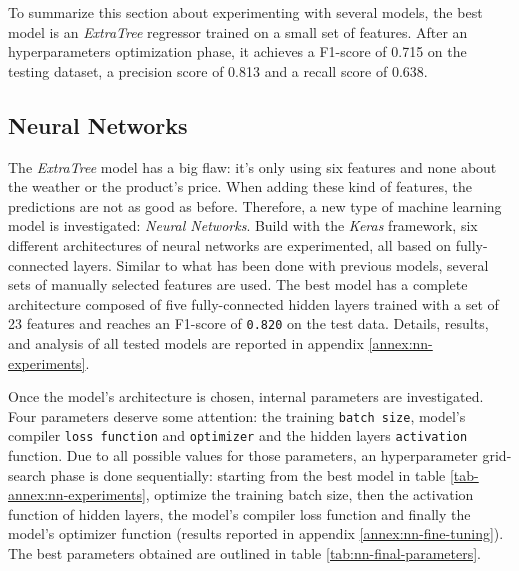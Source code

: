 To summarize this section about experimenting with several models, the best model is an \textit{ExtraTree} regressor trained on a small set of features. After an hyperparameters optimization phase, it achieves a F1-score of 0.715 on the testing dataset, a precision score of 0.813 and a recall score of 0.638.


\subsection{Neural Networks}
The \textit{ExtraTree} model has a big flaw: it's only using six features and none about the weather or the product's price. When adding these kind of features, the predictions are not as good as before. Therefore, a new type of machine learning model is investigated: \textit{Neural Networks}. Build with the \textit{Keras} framework, six different architectures of neural networks are experimented, all based on fully-connected layers. Similar to what has been done with previous models, several sets of manually selected features are used. The best model has a complete architecture composed of five fully-connected hidden layers trained with a set of 23 features and reaches an F1-score of \texttt{0.820} on the test data. Details, results, and analysis of all tested models are reported in appendix \ref{annex:nn-experiments}.

Once the model's architecture is chosen, internal parameters are investigated. Four parameters deserve some attention: the training \texttt{batch size}, model's compiler \texttt{loss function} and \texttt{optimizer} and the hidden layers \texttt{activation} function. Due to all possible values for those parameters, an hyperparameter grid-search phase is done sequentially: starting from the best model in table \ref{tab-annex:nn-experiments}, optimize the training batch size, then the activation function of hidden layers, the model's compiler loss function and finally the model's optimizer function (results reported in appendix \ref{annex:nn-fine-tuning}). The best parameters obtained are outlined in table \ref{tab:nn-final-parameters}.

